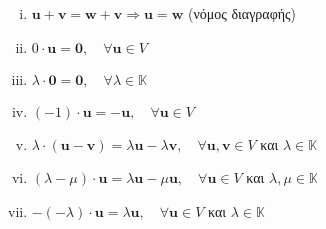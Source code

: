 \begin{thm}
\item {}
    \begin{enumerate}[i)]
        \item $ \mathbf{u} + \mathbf{v} = \mathbf{w} + \mathbf{v} 
            \Rightarrow \mathbf{u} = \mathbf{w} $ \quad (νόμος διαγραφής)
        \item $ 0 \cdot \mathbf{u} = \mathbf{0}, \quad \forall \mathbf{u} \in V $
        \item $ \lambda \cdot \mathbf{0} = \mathbf{0}, \quad \forall \lambda \in 
            \mathbb{K} $
        \item $ (-1)\cdot \mathbf{u} = - \mathbf{u}, \quad \forall \mathbf{u} \in V $ 
        \item $ \lambda \cdot (\mathbf{u} - \mathbf{v}) = 
            \lambda \mathbf{u} - \lambda \mathbf{v}, \quad \forall \mathbf{u}, 
            \mathbf{v} \in V $ και $ \lambda \in \mathbb{K} $
        \item $ (\lambda - \mu ) \cdot \mathbf{u} = \lambda \mathbf{u} - 
            \mu \mathbf{u}, \quad \forall \mathbf{u} \in V $ και $ \lambda, 
            \mu \in \mathbb{K} $
        \item $ -(- \lambda ) \cdot \mathbf{u} = \lambda \mathbf{u}, 
            \quad \forall \mathbf{u} \in V $ και $ \lambda \in \mathbb{K} $
    \end{enumerate}
\end{thm}

